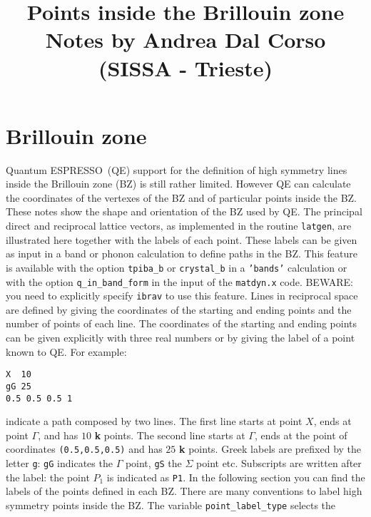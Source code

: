 \documentclass[12pt,a4paper]{article}
\def\qe{{\sc Quantum ESPRESSO}}
\begin{document}
 
\author{}
\date{}
\title{
  \vskip 1cm
  \Huge Points inside the Brillouin zone \\
  \Large Notes by Andrea Dal Corso (SISSA - Trieste)
}
\maketitle

\newpage

\section{Brillouin zone}

\qe\ (QE) support for the definition of high symmetry lines inside the Brillouin
zone (BZ) is still rather limited. However QE can calculate the coordinates 
of the vertexes of the BZ and of particular points inside the BZ. These 
notes show the shape and orientation of the BZ used by QE. The principal 
direct and reciprocal lattice vectors, as implemented 
in the routine \texttt{latgen}, are illustrated here together with the labels 
of each point. These labels can be given as input in a band or phonon 
calculation to define paths in the BZ. This feature is available with 
the option \texttt{tpiba\_b} or \texttt{crystal\_b} in a \texttt{'bands'} 
calculation or with the option \texttt{q\_in\_band\_form} in the input of the 
\texttt{matdyn.x} code.
BEWARE: you need to explicitly specify \texttt{ibrav} to use this feature.
Lines in reciprocal space are defined by giving the coordinates of the 
starting and ending points and the number of points of each line.
The coordinates of the starting and ending points can be 
given explicitly with three real numbers or by giving the label of a 
point known to QE.
For example:
\begin{verbatim}
X  10
gG 25
0.5 0.5 0.5 1
\end{verbatim}
indicate a path composed by two lines. The first line starts at point $X$,
ends at point $\Gamma$, and has $10$ {\bf k} points. The second line starts
at $\Gamma$, ends at the point of coordinates \texttt{(0.5,0.5,0.5)} and
has $25$ {\bf k} points. Greek labels are prefixed by the letter
\texttt{g}: \texttt{gG} indicates the $\Gamma$ point, \texttt{gS} the 
$\Sigma$ point etc. Subscripts are written after the label: the point $P_1$ 
is indicated as \texttt{P1}. In the following section you can find the
labels of the points defined in each BZ. 
There are many conventions to label high symmetry
points inside the BZ. The variable \texttt{point\_label\_type} selects the
\end{document}
